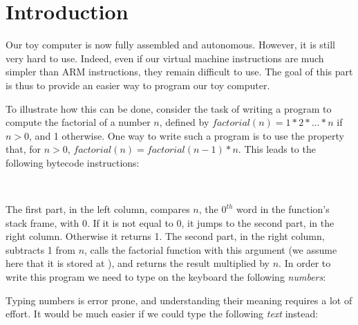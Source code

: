 
\renewcommand{\rustfile}{introduction}
\setcounter{rustid}{0}

\chapter*{Introduction}

Our toy computer is now fully assembled and autonomous. However, it is still
very hard to use. Indeed, even if our virtual machine instructions are much
simpler than ARM instructions, they remain difficult to use. The goal of this
part is thus to provide an easier way to program our toy computer.

To illustrate how this can be done, consider the task of writing a program to
compute the factorial of a number $n$, defined by $factorial(n)=1*2*\ldots*n$
if $n > 0$, and 1 otherwise. One way to write such a program is to use the
property that, for $n>0$, $factorial(n)=factorial(n-1) * n$. This leads to the
following bytecode instructions:


\begin{TwoColumns}
\\
\end{TwoColumns}

The first part, in the left column, compares $n$, the $0^{th}$ word in the
function's stack frame, with 0. If it is not equal to 0, it jumps to the second
part, in the right column. Otherwise it returns 1. The second part, in the
right column, subtracts 1 from $n$, calls the factorial function with this
argument (we assume here that it is stored at ), and returns
the result multiplied by $n$. In order to write this program we need to type on
the keyboard the following {\em numbers}:


Typing numbers is error prone, and understanding their meaning requires a lot
of effort. It would be much easier if we could type the following {\em text}
instead:

